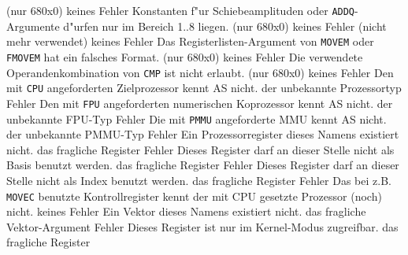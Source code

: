 \documentclass[12pt,a4paper,twoside]{report}
\newcommand{\tty}[1]{{\tt #1}}
\newcommand{\asname}{AS}
\begin{document}
\begin{description}
{                (nur 680x0)}
               {keines}
               {Fehler}
               {Konstanten f"ur Schiebeamplituden oder
                \tty{ADDQ}-Argumente d"urfen nur im Bereich 1..8 liegen. (nur
                680x0)}
               {keines}
               {Fehler}
               {(nicht mehr verwendet)}
               {keines}
               {Fehler}
               {Das Registerlisten-Argument von \tty{MOVEM}
	        oder \tty{FMOVEM} hat ein falsches Format. (nur 680x0)}
               {keines}
               {Fehler}
               {Die verwendete Operandenkombination von \tty{CMP}
	        ist nicht erlaubt. (nur 680x0)}
               {keines}
               {Fehler}
               {Den mit \tty{CPU} angeforderten Zielprozessor kennt \asname{}
                nicht.}
               {der unbekannte Prozessortyp}
               {Fehler}
               {Den mit \tty{FPU} angeforderten numerischen Koprozessor kennt \asname{}
                nicht.}
               {der unbekannte FPU-Typ}
               {Fehler}
               {Die mit \tty{PMMU} angeforderte MMU kennt \asname{} nicht.}
               {der unbekannte PMMU-Typ}
               {Fehler}
               {Ein Prozessorregister dieses Namens existiert nicht.}
               {das fragliche Register}
               {Fehler}
               {Dieses Register darf an dieser Stelle nicht als Basis benutzt
	        werden.}
               {das fragliche Register}
               {Fehler}
               {Dieses Register darf an dieser Stelle nicht als Index benutzt
	        werden.}
               {das fragliche Register}
               {Fehler}
               {Das bei z.B. \tty{MOVEC} benutzte
	        Kontrollregister  kennt der mit CPU gesetzte Prozessor
	        (noch) nicht.}
               {keines}
               {Fehler}
               {Ein Vektor dieses Namens existiert nicht.}
               {das fragliche Vektor-Argument}
               {Fehler}
               {Dieses Register ist nur im Kernel-Modus zugreifbar.}
               {das fragliche Register}

\end{description}
\end{document}
